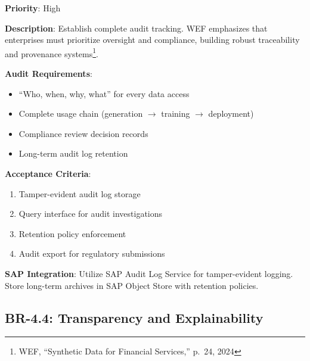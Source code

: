\documentclass[12pt,a4paper,twoside]{report}
\begin{document}
\begin{tcolorbox}[colback=red!5,colframe=red!70,title=BR-4.3: Complete Audit Trail]
\textbf{Priority}: High

\textbf{Description}: Establish complete audit tracking. WEF emphasizes that
enterprises must prioritize oversight and compliance, building robust traceability
and provenance systems\footnote{WEF, ``Synthetic Data for Financial Services,''
p.~24, 2024}.

\textbf{Audit Requirements}:
\begin{itemize}
\item ``Who, when, why, what'' for every data access
\item Complete usage chain (generation $\to$ training $\to$ deployment)
\item Compliance review decision records
\item Long-term audit log retention
\end{itemize}

\textbf{Acceptance Criteria}:
\begin{enumerate}
\item Tamper-evident audit log storage
\item Query interface for audit investigations
\item Retention policy enforcement
\item Audit export for regulatory submissions
\end{enumerate}

\textbf{SAP Integration}: Utilize SAP Audit Log Service for tamper-evident logging.
Store long-term archives in SAP Object Store with retention policies.
\end{tcolorbox}

\subsection{BR-4.4: Transparency and Explainability}
\end{document}
